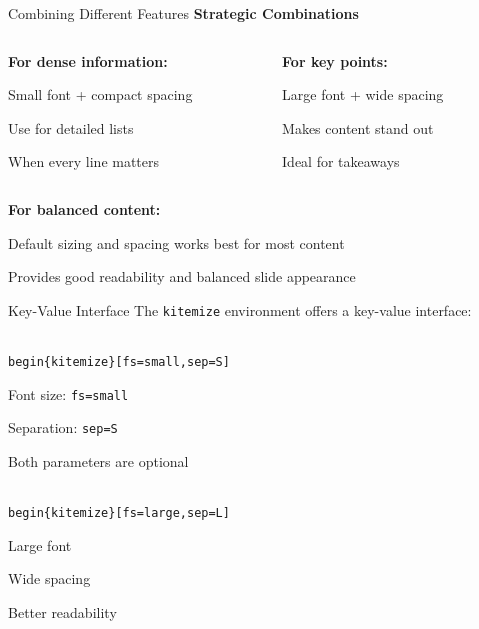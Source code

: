 \documentclass[11pt,compress,t,notes=noshow, xcolor=table]{beamer}
\begin{document}
\begin{frame}{Combining Different Features}
  \textbf{Strategic Combinations}
  
  \begin{columns}[T]
    \begin{column}{0.48\textwidth}
      \textbf{For dense information:}
      \begin{itemizeS}[small]
        \item Small font + compact spacing
        \item Use for detailed lists
        \item When every line matters
      \end{itemizeS}
    \end{column}
    
    \begin{column}{0.48\textwidth}
      \textbf{For key points:}
      \begin{itemizeL}[large]
        \item Large font + wide spacing
        \item Makes content stand out
        \item Ideal for takeaways
      \end{itemizeL}
    \end{column}
  \end{columns}
  
  \vspace{0.5cm}
  \textbf{For balanced content:}
  \begin{itemizeM}
    \item Default sizing and spacing works best for most content
    \item Provides good readability and balanced slide appearance
  \end{itemizeM}
\end{frame}


\begin{frame}{Key-Value Interface}
  The \texttt{kitemize} environment offers a key-value interface:
  
  \vspace{1ex}
  \texttt{\\begin\{kitemize\}[fs=small,sep=S]}
  \begin{kitemize}[fs=small,sep=S]
    \item Font size: \texttt{fs=small}
    \item Separation: \texttt{sep=S}
    \item Both parameters are optional
  \end{kitemize}
  
  \vspace{1ex}
  \texttt{\\begin\{kitemize\}[fs=large,sep=L]}
  \begin{kitemize}[fs=large,sep=L]
    \item Large font
    \item Wide spacing
    \item Better readability
  \end{kitemize}
\end{frame}
\end{document}
